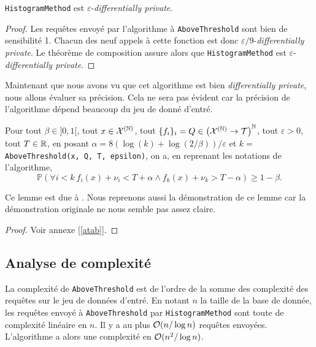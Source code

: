 \begin{definition}
    \texttt{HistogramMethod} est \(\varepsilon\)-\textit{differentially private}.
\end{definition}



\begin{proof}
    Les requêtes envoyé par l'algorithme à \texttt{AboveThreshold} sont bien de sensibilité 1. Chacun des neuf appels à cette fonction est donc \(\varepsilon/9\)-\textit{differentially private}. Le théorème de composition assure alors que \texttt{HistogramMethod} est \(\varepsilon\)-\textit{differentially private}.
\end{proof}

Maintenant que nous avons vu que cet algorithme est bien \textit{differentially private}, nous allons évaluer sa précision. Cela ne sera pas évident car la précision de l'algorithme dépend beaucoup du jeu de donné d'entré.

\begin{lemma}\label{ATalphabeta}
    Pour tout \(\beta \in ]0,1[\), tout \(x \in \mathcal X^{(\mathbb{N})}\), tout \(\{f_i\}_i = Q \in \left( \mathcal X^{(\mathbb{N})} \to  \mathcal T \right)^{\mathbb{N}}\), tout \(\varepsilon > 0\), tout \(T \in \mathbb{R}\),  en posant \(\alpha = 8\left( \log(k) + \log(2/\beta) \right)/\varepsilon\) et \(k = \) \texttt{AboveThreshold(x, Q, T, epsilon)}, on a, en reprenant les notations de l'algorithme,
    \[
        \mathbb P \left( \forall i < k \  f_i(x) + \nu_i < T + \alpha \wedge f_k(x) + \nu_k > T - \alpha \right) \geq 1 - \beta.
    \]
\end{lemma}

\begin{remark}
    Ce lemme est due à \cite[page 61]{dwork2014the}. Nous reprenons aussi la démonstration de ce lemme car la démonstration originale ne nous semble pas assez claire.
\end{remark}

\begin{proof}
    Voir annexe [\ref{atab}].
\end{proof}

\subsection{Analyse de complexité}

La complexité de \texttt{AboveThreshold} est de l'ordre de la somme des complexité des requêtes sur le jeu de données d'entré. En notant \(n\) la taille de la base de donnée, les requêtes envoyé à \texttt{AboveThreshold} par \texttt{HistogramMethod} sont toute de complexité linéaire en \(n\). Il y a au plus \(\mathcal{O}(n/\log n)\) requêtes envoyées. L'algorithme a alors une complexité en \(\mathcal{O}(n^2/\log n)\).


